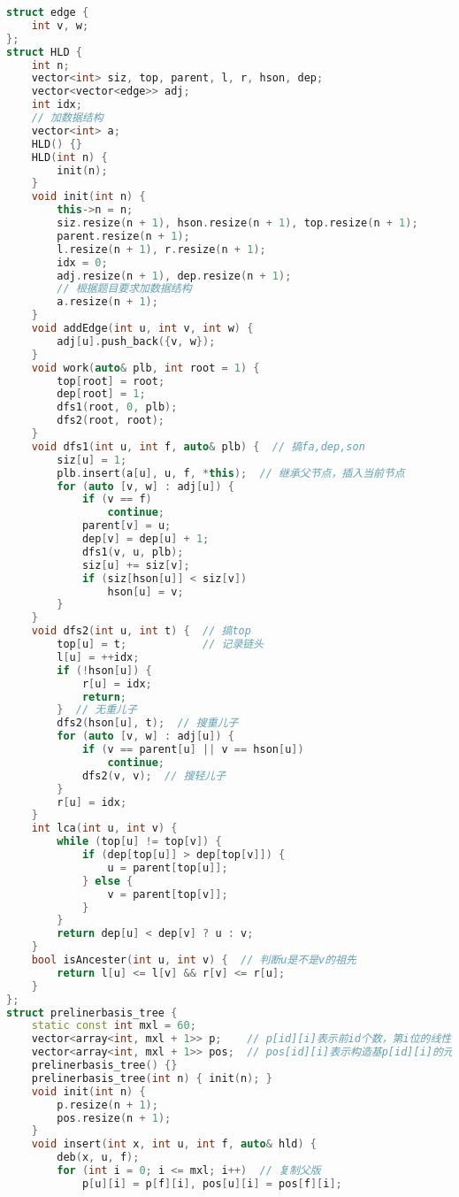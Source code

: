 \begin{lstlisting}[language=C++]
struct edge {
    int v, w;
};
struct HLD {
    int n;
    vector<int> siz, top, parent, l, r, hson, dep;
    vector<vector<edge>> adj;
    int idx;
    // 加数据结构
    vector<int> a;
    HLD() {}
    HLD(int n) {
        init(n);
    }
    void init(int n) {
        this->n = n;
        siz.resize(n + 1), hson.resize(n + 1), top.resize(n + 1);
        parent.resize(n + 1);
        l.resize(n + 1), r.resize(n + 1);
        idx = 0;
        adj.resize(n + 1), dep.resize(n + 1);
        // 根据题目要求加数据结构
        a.resize(n + 1);
    }
    void addEdge(int u, int v, int w) {
        adj[u].push_back({v, w});
    }
    void work(auto& plb, int root = 1) {
        top[root] = root;
        dep[root] = 1;
        dfs1(root, 0, plb);
        dfs2(root, root);
    }
    void dfs1(int u, int f, auto& plb) {  // 搞fa,dep,son
        siz[u] = 1;
        plb.insert(a[u], u, f, *this);  // 继承父节点，插入当前节点
        for (auto [v, w] : adj[u]) {
            if (v == f)
                continue;
            parent[v] = u;
            dep[v] = dep[u] + 1;
            dfs1(v, u, plb);
            siz[u] += siz[v];
            if (siz[hson[u]] < siz[v])
                hson[u] = v;
        }
    }
    void dfs2(int u, int t) {  // 搞top
        top[u] = t;            // 记录链头
        l[u] = ++idx;
        if (!hson[u]) {
            r[u] = idx;
            return;
        }  // 无重儿子
        dfs2(hson[u], t);  // 搜重儿子
        for (auto [v, w] : adj[u]) {
            if (v == parent[u] || v == hson[u])
                continue;
            dfs2(v, v);  // 搜轻儿子
        }
        r[u] = idx;
    }
    int lca(int u, int v) {
        while (top[u] != top[v]) {
            if (dep[top[u]] > dep[top[v]]) {
                u = parent[top[u]];
            } else {
                v = parent[top[v]];
            }
        }
        return dep[u] < dep[v] ? u : v;
    }
    bool isAncester(int u, int v) {  // 判断u是不是v的祖先
        return l[u] <= l[v] && r[v] <= r[u];
    }
};
struct prelinerbasis_tree {
    static const int mxl = 60;
    vector<array<int, mxl + 1>> p;    // p[id][i]表示前id个数，第i位的线性基
    vector<array<int, mxl + 1>> pos;  // pos[id][i]表示构造基p[id][i]的元素的下标最大值
    prelinerbasis_tree() {}
    prelinerbasis_tree(int n) { init(n); }
    void init(int n) {
        p.resize(n + 1);
        pos.resize(n + 1);
    }
    void insert(int x, int u, int f, auto& hld) {
        deb(x, u, f);
        for (int i = 0; i <= mxl; i++)  // 复制父版
            p[u][i] = p[f][i], pos[u][i] = pos[f][i];

\end{lstlisting}
